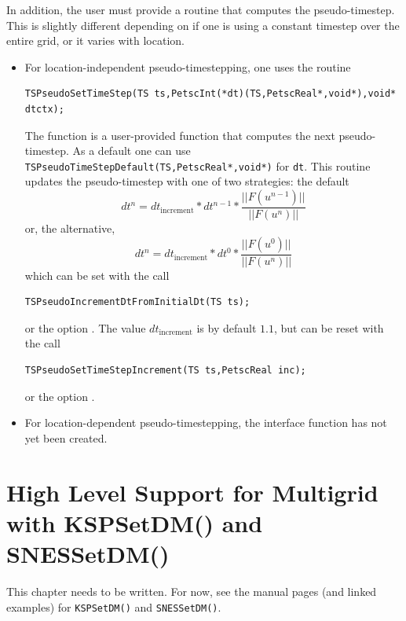 In addition, the user must provide a routine that computes the
pseudo-timestep. This is slightly different depending on if
one is using a constant timestep over the entire grid, or it varies
with location.
\begin{itemize}
\item For location-independent pseudo-timestepping, one uses the routine
\begin{lstlisting}
TSPseudoSetTimeStep(TS ts,PetscInt(*dt)(TS,PetscReal*,void*),void* dtctx);
\end{lstlisting}
The function  is a user-provided function that computes the next
pseudo-timestep. As a default one can use
\lstinline{TSPseudoTimeStepDefault(TS,PetscReal*,void*)} for \lstinline{dt}. This routine
updates the pseudo-timestep with one of two strategies: the default
\[
   dt^{n} = dt_{\mathrm{increment}}*dt^{n-1}*\frac{|| F(u^{n-1}) ||}{|| F(u^{n})||}
\]
or, the alternative,
\[
   dt^{n} = dt_{\mathrm{increment}}*dt^{0}*\frac{|| F(u^{0}) ||}{|| F(u^{n})||}
\]
which can be set with the call
\begin{lstlisting}
TSPseudoIncrementDtFromInitialDt(TS ts);
\end{lstlisting}
or
the option .
The value $ dt_{\mathrm{increment}} $ is by default $ 1.1$, but can be reset with the
call
\begin{lstlisting}
TSPseudoSetTimeStepIncrement(TS ts,PetscReal inc);
\end{lstlisting}
or  the option
. 


\item For location-dependent pseudo-timestepping, the interface function
      has not yet been created.
\end{itemize}

\cleardoublepage
\chapter{High Level Support for Multigrid with KSPSetDM() and SNESSetDM()}
\label{chapter_kspdm}

This chapter needs to be written. For now, see the manual pages (and linked examples) for \lstinline{KSPSetDM()} and \lstinline{SNESSetDM()}.

\cleardoublepage
